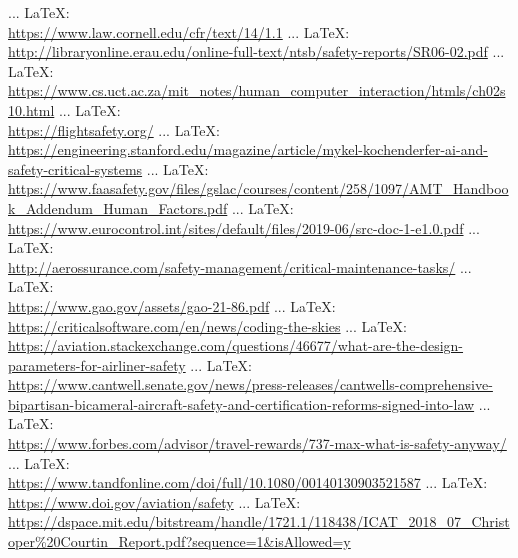 \begin{thebibliography}{99}
{{ ... \LaTeX:\\ \url{https://www.law.cornell.edu/cfr/text/14/1.1}
 ... \LaTeX:\\ \url{http://libraryonline.erau.edu/online-full-text/ntsb/safety-reports/SR06-02.pdf}
 ... \LaTeX:\\ \url{https://www.cs.uct.ac.za/mit_notes/human_computer_interaction/htmls/ch02s10.html}
 ... \LaTeX:\\ \url{https://flightsafety.org/}
 ... \LaTeX:\\ \url{https://engineering.stanford.edu/magazine/article/mykel-kochenderfer-ai-and-safety-critical-systems}
 ... \LaTeX:\\ \url{https://www.faasafety.gov/files/gslac/courses/content/258/1097/AMT_Handbook_Addendum_Human_Factors.pdf}
 ... \LaTeX:\\ \url{https://www.eurocontrol.int/sites/default/files/2019-06/src-doc-1-e1.0.pdf}
 ... \LaTeX:\\ \url{http://aerossurance.com/safety-management/critical-maintenance-tasks/}
 ... \LaTeX:\\ \url{https://www.gao.gov/assets/gao-21-86.pdf}
 ... \LaTeX:\\ \url{https://criticalsoftware.com/en/news/coding-the-skies}
 ... \LaTeX:\\ \url{https://aviation.stackexchange.com/questions/46677/what-are-the-design-parameters-for-airliner-safety}
 ... \LaTeX:\\ \url{https://www.cantwell.senate.gov/news/press-releases/cantwells-comprehensive-bipartisan-bicameral-aircraft-safety-and-certification-reforms-signed-into-law}
 ... \LaTeX:\\ \url{https://www.forbes.com/advisor/travel-rewards/737-max-what-is-safety-anyway/}
 ... \LaTeX:\\ \url{https://www.tandfonline.com/doi/full/10.1080/00140130903521587}
 ... \LaTeX:\\ \url{https://www.doi.gov/aviation/safety}
 ... \LaTeX:\\ \url{https://dspace.mit.edu/bitstream/handle/1721.1/118438/ICAT_2018_07_Christoper%20Courtin_Report.pdf?sequence=1&isAllowed=y}
}}
\end{thebibliography}
